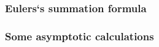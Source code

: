 \tasktodo

\tasktodo

\subsubsection{Eulers`s summation formula}

\tasktodo

\tasktodo

\tasktodo

\tasktodo

\tasktodo

\tasktodo

\tasktodo

\tasktodo

\tasktodo

\subsubsection{Some asymptotic calculations}

\tasktodo

\tasktodo

\tasktodo

\tasktodo

\tasktodo

\tasktodo

\tasktodo

\tasktodo

\tasktodo

\tasktodo

\tasktodo

\tasktodo

\tasktodo

\tasktodo

\tasktodo

\tasktodo

\tasktodo

\tasktodo

\tasktodo

\tasktodo

